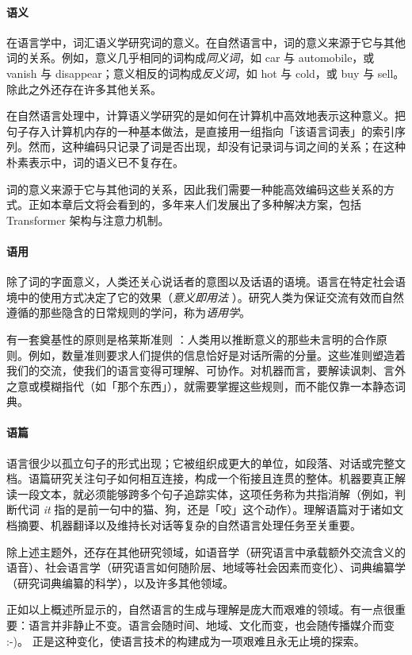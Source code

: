 \paragraph{语义} 在语言学中，词汇语义学研究词的意义。在自然语言中，词的意义来源于它与其他词的关系。例如，意义几乎相同的词构成{\em 同义词}，如 car 与 automobile，或 vanish 与 disappear；意义相反的词构成{\em 反义词}，如 hot 与 cold，或 buy 与 sell。除此之外还存在许多其他关系。
    
在自然语言处理中，计算语义学研究的是如何在计算机中高效地表示这种意义。把句子存入计算机内存的一种基本做法，是直接用一组指向「该语言词表」的索引序列。然而，这种编码只记录了词是否出现，却没有记录词与词之间的关系；在这种朴素表示中，词的语义已不复存在。

词的意义来源于它与其他词的关系，因此我们需要一种能高效编码这些关系的方式。正如本章后文将会看到的，多年来人们发展出了多种解决方案，包括 Transformer 架构与注意力机制。
    
\paragraph{语用} 除了词的字面意义，人类还关心说话者的意图以及话语的语境。语言在特定社会语境中的使用方式决定了它的效果（{\em 意义即用法} \citep{baker2008wittgenstein}）。研究人类为保证交流有效而自然遵循的那些隐含的日常规则的学问，称为{\em 语用学}。

有一套奠基性的原则是格莱斯准则 \citep{Grice_1975}：人类用以推断意义的那些未言明的合作原则。例如，数量准则要求人们提供的信息恰好是对话所需的分量。这些准则塑造着我们的交流，使我们的语言变得可理解、可协作。对机器而言，要解读讽刺、言外之意或模糊指代（如「那个东西」），就需要掌握这些规则，而不能仅靠一本静态词典。

\paragraph{语篇} 语言很少以孤立句子的形式出现；它被组织成更大的单位，如段落、对话或完整文档。语篇研究关注句子如何相互连接，构成一个衔接且连贯的整体。机器要真正解读一段文本，就必须能够跨多个句子追踪实体，这项任务称为共指消解（例如，判断代词 {\em it} 指的是前一句中的猫、狗，还是「咬」这个动作）。理解语篇对于诸如文档摘要、机器翻译以及维持长对话等复杂的自然语言处理任务至关重要。

除上述主题外，还存在其他研究领域，如语音学（研究语言中承载额外交流含义的语音）、社会语言学（研究语言如何随阶层、地域等社会因素而变化）、词典编纂学（研究词典编纂的科学），以及许多其他领域。

正如以上概述所显示的，自然语言的生成与理解是庞大而艰难的领域。有一点很重要：语言并非静止不变。语言会随时间、地域、文化而变，也会随传播媒介而变 :-)。%
正是这种变化，使语言技术的构建成为一项艰难且永无止境的探索。

